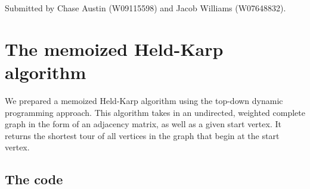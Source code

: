 \documentclass[10pt]{extarticle}
\begin{document}
 
 
 Submitted by Chase Austin (W09115598) and Jacob Williams (W07648832).
 
 \section{The memoized Held-Karp algorithm} We prepared a memoized Held-Karp
 algorithm using the top-down dynamic programming approach. This algorithm takes in
 an undirected, weighted complete graph in the form of an adjacency matrix, as well
 as a given start vertex. It returns the shortest tour of all vertices in the graph
 that begin at the start vertex.  
 
 \subsection{The code}
\end{document}

